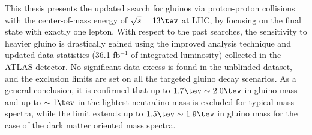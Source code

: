 This thesis presents the updated search for gluinos via proton-proton collisions with the center-of-mass energy of $\sqrt{s}=13\tev$ at LHC, by focusing on the final state with exactly one lepton. 
With respect to the past searches, the sensitivity to heavier gluino is drastically gained using the improved analysis technique and updated data statistics (36.1 fb$^{-1}$ of integrated luminosity) collected in the ATLAS detector. 
%
No significant data excess is found in the unblinded dataset, and the exclusion limits are set on all the targeted gluino decay scenarios. 
As a general conclusion,
it is confirmed that up to $1.7\tev \sim 2.0 \tev$ in gluino mass and up to $\sim 1\tev$ in the lightest neutralino mass is excluded for typical mass spectra, 
while the limit extends up to $1.5\tev \sim 1.9 \tev$ in gluino mass for the case of the dark matter oriented mass spectra.


\clearpage






%
